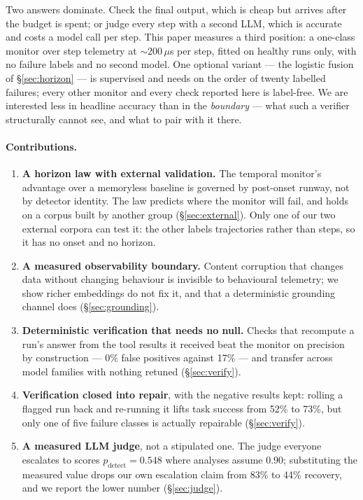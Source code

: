 \documentclass{article}
\begin{document}
Two answers dominate. Check the final output, which is cheap but arrives after
the budget is spent; or judge every step with a second LLM, which is accurate
and costs a model call per step. This paper measures a third position: a
one-class monitor over step telemetry at $\sim$200\,$\mu$s per step, fitted on
healthy runs only, with no failure labels and no second model. One optional
variant --- the logistic fusion of \S\ref{sec:horizon} --- is supervised and
needs on the order of twenty labelled failures; every other monitor and every
check reported here is label-free. We are interested less in headline accuracy
than in the \emph{boundary} --- what such a verifier structurally cannot see,
and what to pair with it there.

\paragraph{Contributions.}
\begin{enumerate}\itemsep2pt
\item \textbf{A horizon law with external validation.} The temporal monitor's
      advantage over a memoryless baseline is governed by post-onset runway,
      not by detector identity. The law predicts where the monitor will fail,
      and holds on a corpus built by another group (\S\ref{sec:external}). Only
      one of our two external corpora can test it: the other labels
      trajectories rather than steps, so it has no onset and no horizon.
\item \textbf{A measured observability boundary.} Content corruption that
      changes data without changing behaviour is invisible to behavioural
      telemetry; we show richer embeddings do not fix it, and that a
      deterministic grounding channel does (\S\ref{sec:grounding}).
\item \textbf{Deterministic verification that needs no null.} Checks that
      recompute a run's answer from the tool results it received beat the
      monitor on precision by construction --- 0\% false positives against 17\%
      --- and transfer across model families with nothing retuned
      (\S\ref{sec:verify}).
\item \textbf{Verification closed into repair}, with the negative results kept:
      rolling a flagged run back and re-running it lifts task success from 52\%
      to 73\%, but only one of five failure classes is actually repairable
      (\S\ref{sec:verify}).
\item \textbf{A measured LLM judge}, not a stipulated one. The judge everyone
      escalates to scores $p_{\text{detect}}=0.548$ where analyses assume 0.90;
      substituting the measured value drops our own escalation claim from 83\%
      to 44\% recovery, and we report the lower number (\S\ref{sec:judge}).
\end{enumerate}
\end{document}

